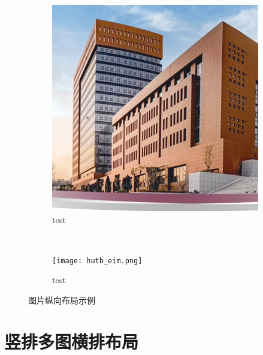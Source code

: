 \begin{figure}[!htb]
    \centering
    \begin{subfigure}[t]{0.15\linewidth}
        \captionsetup{justification=centering} %
        \begin{minipage}[b]{1\linewidth}
        \includegraphics[width=1\linewidth]{hutb_building.png}
        \caption{test}
        \end{minipage}
    \end{subfigure}\\
    \begin{subfigure}[t]{0.15\linewidth}
        \captionsetup{justification=centering} %
        \begin{minipage}[b]{1\linewidth}
        \texttt{[image: hutb\_eim.png]}
        \caption{test}
        \end{minipage}
    \end{subfigure}
    \caption{图片纵向布局示例}
    \label{f.col}
\end{figure}

\section{竖排多图横排布局}

